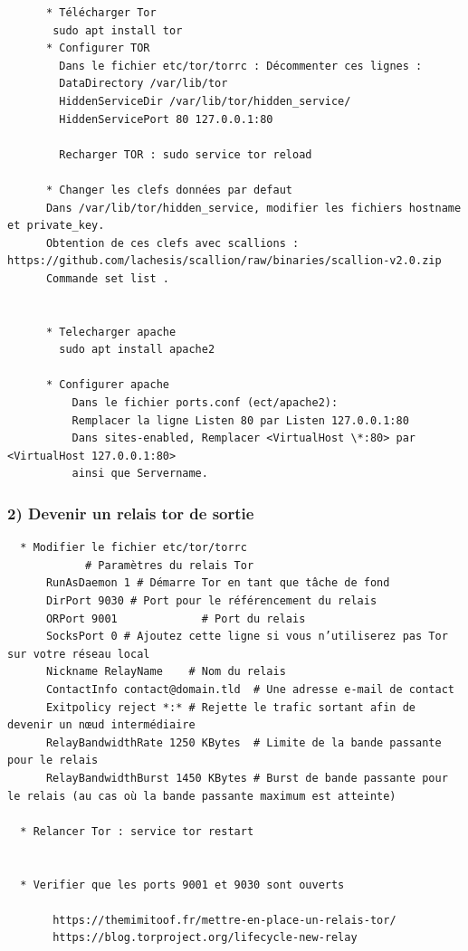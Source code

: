 \documentclass[]{article}
\begin{document}
\begin{verbatim}
      * Télécharger Tor
       sudo apt install tor
      * Configurer TOR
        Dans le fichier etc/tor/torrc : Décommenter ces lignes :
        DataDirectory /var/lib/tor
        HiddenServiceDir /var/lib/tor/hidden_service/
        HiddenServicePort 80 127.0.0.1:80

        Recharger TOR : sudo service tor reload

      * Changer les clefs données par defaut
      Dans /var/lib/tor/hidden_service, modifier les fichiers hostname et private_key.
      Obtention de ces clefs avec scallions : https://github.com/lachesis/scallion/raw/binaries/scallion-v2.0.zip
      Commande set list .


      * Telecharger apache
        sudo apt install apache2

      * Configurer apache
          Dans le fichier ports.conf (ect/apache2):
          Remplacer la ligne Listen 80 par Listen 127.0.0.1:80
          Dans sites-enabled, Remplacer <VirtualHost \*:80> par <VirtualHost 127.0.0.1:80>
          ainsi que Servername.
\end{verbatim}

\subsubsection{2) Devenir un relais tor de
sortie}\label{devenir-un-relais-tor-de-sortie}

\begin{verbatim}
  * Modifier le fichier etc/tor/torrc
            # Paramètres du relais Tor
      RunAsDaemon 1 # Démarre Tor en tant que tâche de fond
      DirPort 9030 # Port pour le référencement du relais
      ORPort 9001             # Port du relais
      SocksPort 0 # Ajoutez cette ligne si vous n’utiliserez pas Tor sur votre réseau local
      Nickname RelayName    # Nom du relais
      ContactInfo contact@domain.tld  # Une adresse e-mail de contact
      Exitpolicy reject *:* # Rejette le trafic sortant afin de devenir un nœud intermédiaire
      RelayBandwidthRate 1250 KBytes  # Limite de la bande passante pour le relais
      RelayBandwidthBurst 1450 KBytes # Burst de bande passante pour le relais (au cas où la bande passante maximum est atteinte)

  * Relancer Tor : service tor restart


  * Verifier que les ports 9001 et 9030 sont ouverts

       https://themimitoof.fr/mettre-en-place-un-relais-tor/
       https://blog.torproject.org/lifecycle-new-relay
\end{verbatim}
\end{document}
